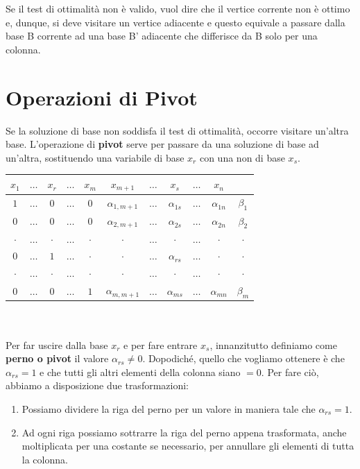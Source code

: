 Se il test di ottimalità non è valido, vuol dire che il vertice corrente non è ottimo e, dunque, si deve visitare un vertice adiacente e questo equivale a passare dalla base B corrente ad una base B' adiacente che differisce da B solo per una colonna.
\section{Operazioni di Pivot}
Se la soluzione di base non soddisfa il test di ottimalità, occorre visitare un'altra base. L'operazione di \textbf{pivot} serve per passare da una soluzione di base ad un'altra, sostituendo una variabile di base $x_r$ con una non di base $x_s$.\\

\begin{tabular}{| c c c c c c c c c c | c |}
\hline
$x_1$ & $\dots$ & $x_r$ & $\dots$ & $x_m$ & $x_{m+1}$ & $\dots$ & $x_s$ & $\dots$ & $x_n$ & \\
\hline
$1$ & $\dots$ & $0$ & $\dots$ & $0$ & $\alpha_{1,m+1}$ & $\dots$ & $\alpha_{1s}$ & $\dots$ & $\alpha_{1n}$ & $\beta_1$ \\
$0$ & $\dots$ & $0$ & $\dots$ & $0$ & $\alpha_{2,m+1}$ & $\dots$ & $\alpha_{2s}$ & $\dots$ & $\alpha_{2n}$ & $\beta_2$ \\
$\cdot$ & $\dots$ & $\cdot$ & $\dots$ & $\cdot$ & $\cdot$ & $\dots$ & $\cdot$ & $\dots$ & $\cdot$ & $\cdot$ \\
$0$ & $\dots$ & $1$ & $\dots$ & $\cdot$ & $\cdot$ & $\dots$ & $\alpha_{rs}$ & $\dots$ & $\cdot$ & $\cdot$ \\
$\cdot$ & $\dots$ & $\cdot$ & $\dots$ & $\cdot$ & $\cdot$ & $\dots$ & $\cdot$ & $\dots$ & $\cdot$ & $\cdot$ \\
$0$ & $\dots$ & $0$ & $\dots$ & $1$ & $\alpha_{m,m+1}$ & $\dots$ & $\alpha_{ms}$ & $\dots$ & $\alpha_{mn}$ & $\beta_m$ \\
\hline
\end{tabular}
\\
\\
Per far uscire dalla base $x_r$ e per fare entrare $x_s$, innanzitutto definiamo come \textbf{perno o pivot} il valore $\alpha_{rs}\neq 0$. Dopodiché, quello che vogliamo ottenere è che $\alpha_{rs}=1$ e che tutti gli altri elementi della colonna siano $=0$. Per fare ciò, abbiamo a disposizione due trasformazioni:
\begin{enumerate}
    \item Possiamo dividere la riga del perno per un valore in maniera tale che $\alpha_{rs}=1$.
    \item Ad ogni riga possiamo sottrarre la riga del perno appena trasformata, anche moltiplicata per una costante se necessario, per annullare gli elementi di tutta la colonna. 
\end{enumerate}

